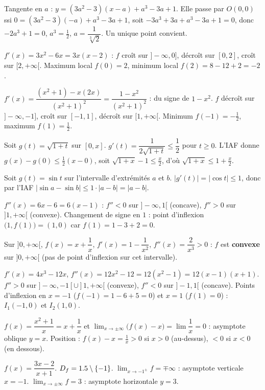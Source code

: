 Tangente en $a$ : $y=(3a^{2}-3)(x-a)+a^{3}-3a+1$. Elle passe par $O(0,0)$ ssi
$0=(3a^{2}-3)(-a)+a^{3}-3a+1$, soit $-3a^{3}+3a+a^{3}-3a+1=0$, donc $-2a^{3}+1=0$,
$a^{3}=\tfrac12$, $a=\dfrac1{\sqrt[3]{2}}$. Un unique point convient.

$f'(x)=3x^{2}-6x=3x(x-2)$ : $f$ croît sur $]-\infty,0]$, décroît sur $[0,2]$, croît sur
$[2,+\infty[$. Maximum local $f(0)=2$, minimum local $f(2)=8-12+2=-2$.

$f'(x)=\dfrac{(x^{2}+1)-x(2x)}{(x^{2}+1)^{2}}=\dfrac{1-x^{2}}{(x^{2}+1)^{2}}$ : du signe de $1-x^{2}$.
$f$ décroît sur $]-\infty,-1]$, croît sur $[-1,1]$, décroît sur $[1,+\infty[$. Minimum
$f(-1)=-\tfrac12$, maximum $f(1)=\tfrac12$.

Soit $g(t)=\sqrt{1+t}$ sur $[0,x]$. $g'(t)=\dfrac1{2\sqrt{1+t}}\le\dfrac12$ pour $t\ge0$.
L'IAF donne $g(x)-g(0)\le\tfrac12(x-0)$, soit $\sqrt{1+x}-1\le\tfrac x2$, d'où
$\sqrt{1+x}\le1+\tfrac x2$.

Soit $g(t)=\sin t$ sur l'intervalle d'extrémités $a$ et $b$. $|g'(t)|=|\cos t|\le1$, donc
par l'IAF $|\sin a-\sin b|\le 1\cdot|a-b|=|a-b|$.

$f''(x)=6x-6=6(x-1)$ : $f''<0$ sur $]-\infty,1[$ (concave), $f''>0$ sur $]1,+\infty[$ (convexe).
Changement de signe en $1$ : point d'inflexion $\big(1,f(1)\big)=(1,0)$ car $f(1)=1-3+2=0$.

Sur $]0,+\infty[$, $f(x)=x+\dfrac1x$, $f'(x)=1-\dfrac1{x^{2}}$, $f''(x)=\dfrac{2}{x^{3}}>0$ :
$f$ est \textbf{convexe} sur $]0,+\infty[$ (pas de point d'inflexion sur cet intervalle).

$f'(x)=4x^{3}-12x$, $f''(x)=12x^{2}-12=12(x^{2}-1)=12(x-1)(x+1)$. $f''>0$ sur
$]-\infty,-1[\cup]1,+\infty[$ (convexe), $f''<0$ sur $]-1,1[$ (concave). Points d'inflexion en
$x=-1$ ($f(-1)=1-6+5=0$) et $x=1$ ($f(1)=0$) : $I_1(-1,0)$ et $I_2(1,0)$.

$f(x)=\dfrac{x^{2}+1}{x}=x+\dfrac1x$ et $\displaystyle\lim_{x\to\pm\infty}\big(f(x)-x\big)=\lim\dfrac1x=0$ :
asymptote oblique $y=x$. Position : $f(x)-x=\tfrac1x>0$ si $x>0$ (au-dessus), $<0$ si $x<0$ (en dessous).

$f(x)=\dfrac{3x-2}{x+1}$. $D_f=1.5\setminus\{-1\}$. $\displaystyle\lim_{x\to-1^{\pm}}f=\mp\infty$ :
asymptote verticale $x=-1$. $\displaystyle\lim_{x\to\pm\infty}f=3$ : asymptote horizontale $y=3$.

